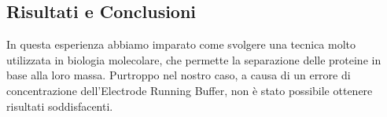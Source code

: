 \subsection{Risultati e Conclusioni}

In questa esperienza abbiamo imparato come svolgere una tecnica
molto utilizzata in biologia molecolare, che permette la separazione
delle proteine in base alla loro massa.
Purtroppo nel nostro caso, a causa di un errore di concentrazione
dell'Electrode Running Buffer, non \`e stato possibile ottenere
risultati soddisfacenti.
